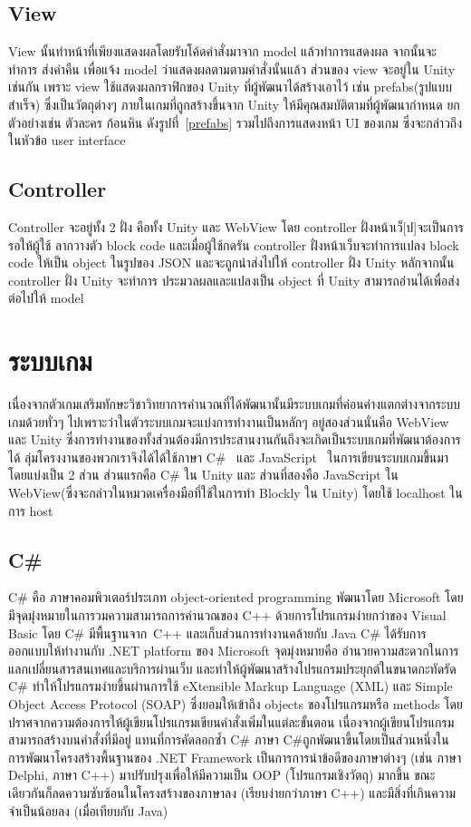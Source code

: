  \subsection{View}
 View นั้นทำหน้าที่เพียงแสดงผลโดยรับโค้ดคำสั่งมาจาก model แล้วทำการแสดงผล จากนั้นจะทำการ
 ส่งค่าคืน เพื่อแจ้ง model ว่าแสดงผลตามตามคำสั่งนั้นแล้ว ส่วนของ view จะอยู่ใน
 Unity เช่นกัน เพราะ view ใช้แสดงผลกราฟิกของ Unity ที่ผู้พัฒนาได้สร้างเอาไว้ เช่น prefabs(รูปแบบสำเร็จ) 
 ซึ่งเป็นวัตถุต่างๆ ภายในเกมที่ถูกสร้างขึ้นจาก Unity ให้มีคุณสมบัติตามที่ผู้พัฒนากำหนด ยกตัวอย่างเช่น ตัวละคร ก้อนหิน ดังรูปที่~\ref{prefabs}
 รวมไปถึงการแสดงหน้า UI ของเกม ซึ่งจะกล่าวถึงในหัวข้อ user interface
    

\subsection{Controller}
Controller จะอยู่ทั้ง 2 ฝั่ง คือทั้ง Unity และ WebView โดย controller ฝั่งหน้าเว็[ป]จะเป็นการรอให้ผู้ใช้
ลากวางตัว block code และเมื่อผู้ใช้กดรัน controller ฝั่งหน้าเว็บจะทำการแปลง block code ให้เป็น object 
ในรูปของ JSON และจะถูกนำส่งไปให้ controller ฝั่ง Unity หลักจากนั้น controller ฝั่ง Unity จะทำการ
ประมวลผลและแปลงเป็น object ที่ Unity สามารถอ่านได้เพื่อส่งต่อไปให้ model


\section{ระบบเกม}
เนื่องจากตัวเกมเสริมทักษะวิชาวิทยาการคำนวณที่ได้พัฒนานั้นมีระบบเกมที่ค่อนค่างแตกต่างจากระบบเกมด้วยทั่วๆ ไปเพราะว่าในตัวระบบเกมจะแบ่งการทำงานเป็นหลักๆ อยู่สองส่วนนั่นคือ WebView และ Unity
ซึ่งการทำงานของทั้งส่วนต้องมีการประสานงานกันถึงจะเกิดเป็นระบบเกมที่พัฒนาต้องการได้ ลุ่มโครงงานของพวกเราจึงได้ได้ใช้ภาษา C\#~\cite{cs} และ JavaScript~\cite{js}
ในการเขียนระบบเกมขึ้นมา โดยแบ่งเป็น 2 ส่วน ส่วนแรกคือ C\# ใน Unity 
และ ส่วนที่สองคือ JavaScript ใน WebView(ซึ่งจะกล่าวในหมวดเครื่องมือที่ใช้ในการทำ Blockly ใน Unity) โดยใช้ localhost ในการ host
\subsection{C\#}
C\# คือ ภาษาคอมพิวเตอร์ประเภท object-oriented programming พัฒนาโดย Microsoft โดยมีจุดมุ่งหมายในการวมความสามารถการคำนวณของ 
C++ ด้วยการโปรแกรมง่ายกว่าของ Visual Basic โดย C\# มีพื้นฐานจาก 
C++ และเก็บส่วนการทำงานคล้ายกับ Java 
C\# ได้รับการออกแบบให้ทำงานกับ .NET platform ของ Microsoft
จุดมุ่งหมายคือ อำนวยความสะดวกในการแลกเปลี่ยนสารสนเทศและบริการผ่านเว็บ 
และทำให้ผู้พัฒนาสร้างโปรแกรมประยุกต์ในขนาดกะทัดรัด C\# 
ทำให้โปรแกรมง่ายขึ้นผ่านการใช้ eXtensible Markup Language (XML) 
และ Simple Object Access Protocol (SOAP) 
ซึ่งยอมให้เข้าถึง objects ของโปรแกรมหรือ methods 
โดยปราศจากความต้องการให้ผู้เขียนโปรแกรมเขียนคำสั่งเพิ่มในแต่ละขั้นตอน 
เนื่องจากผู้เขียนโปรแกรมสามารถสร้างบนคำสั่งที่มีอยู่ 
แทนที่การคัดลอกซ้ำ C\# \newline
ภาษา C\#ถูกพัฒนาขึ้นโดยเป็นส่วนหนึ่งในการพัฒนาโครงสร้างพื้นฐานของ
.NET Framework เป็นการการนำข้อดีของภาษาต่างๆ 
(เช่น ภาษา Delphi, ภาษา C++) มาปรับปรุงเพื่อให้มีความเป็น OOP 
(โปรแกรมเชิงวัตถุ) มากขึ้น ขณะเดียวกันก็ลดความซับซ้อนในโครงสร้างของภาษาลง (เรียบง่ายกว่าภาษา C++) 
และมีสิ่งที่เกินความจำเป็นน้อยลง (เมื่อเทียบกับ Java)~\cite{cs}

